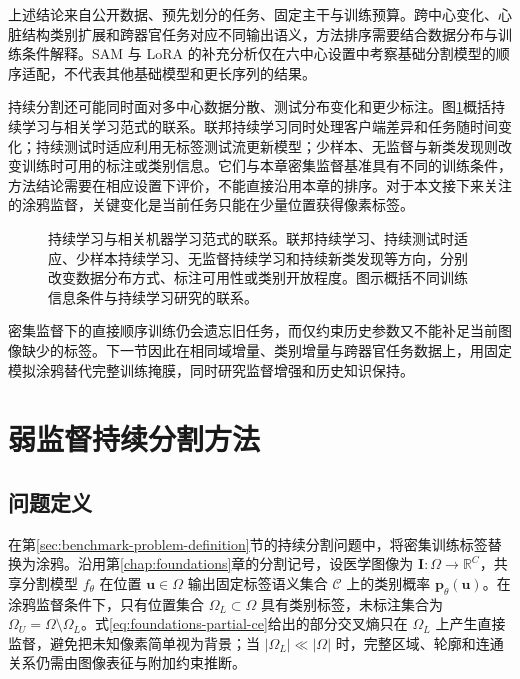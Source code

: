 上述结论来自公开数据、预先划分的任务、固定主干与训练预算。跨中心变化、心脏结构类别扩展和跨器官任务对应不同输出语义，方法排序需要结合数据分布与训练条件解释。SAM 与 LoRA 的补充分析仅在六中心设置中考察基础分割模型的顺序适配，不代表其他基础模型和更长序列的结果。

\label{subsec:benchmark-related-paradigms}
持续分割还可能同时面对多中心数据分散、测试分布变化和更少标注。图\ref{fig:benchmark-related-paradigms}概括持续学习与相关学习范式的联系。联邦持续学习同时处理客户端差异和任务随时间变化\cite{yang2024fclsurvey,yoon2021fedweit}；持续测试时适应利用无标签测试流更新模型\cite{wang2021tent,hu2021fullytta}；少样本、无监督与新类发现则改变训练时可用的标注或类别信息。它们与本章密集监督基准具有不同的训练条件，方法结论需要在相应设置下评价，不能直接沿用本章的排序。对于本文接下来关注的涂鸦监督，关键变化是当前任务只能在少量位置获得像素标签。

\begin{figure}[htbp]
\centering
{}
\caption[持续学习与相关机器学习范式的联系]{持续学习与相关机器学习范式的联系。联邦持续学习、持续测试时适应、少样本持续学习、无监督持续学习和持续新类发现等方向，分别改变数据分布方式、标注可用性或类别开放程度。图示概括不同训练信息条件与持续学习研究的联系。}
\label{fig:benchmark-related-paradigms}
\end{figure}


密集监督下的直接顺序训练仍会遗忘旧任务，而仅约束历史参数又不能补足当前图像缺少的标签。下一节因此在相同域增量、类别增量与跨器官任务数据上，用固定模拟涂鸦替代完整训练掩膜，同时研究监督增强和历史知识保持。

\section{弱监督持续分割方法}
\label{sec:scribblecl}

\subsection{问题定义}
\label{sec:scribblecl-formulation}

在第\ref{sec:benchmark-problem-definition}节的持续分割问题中，将密集训练标签替换为涂鸦。沿用第\ref{chap:foundations}章的分割记号，设医学图像为
$\mathbf{I}:\Omega\rightarrow\mathbb{R}^{C}$，共享分割模型
$f_{\theta}$ 在位置 $\mathbf{u}\in\Omega$ 输出固定标签语义集合
$\mathcal{C}$ 上的类别概率 $\mathbf{p}_{\theta}(\mathbf{u})$。在涂鸦监督条件下，只有位置集合
$\Omega_L\subset\Omega$ 具有类别标签，未标注集合为
$\Omega_U=\Omega\setminus\Omega_L$。式\eqref{eq:foundations-partial-ce}给出的部分交叉熵只在 $\Omega_L$ 上产生直接监督，避免把未知像素简单视为背景；当 $|\Omega_L|\ll|\Omega|$ 时，完整区域、轮廓和连通关系仍需由图像表征与附加约束推断。

